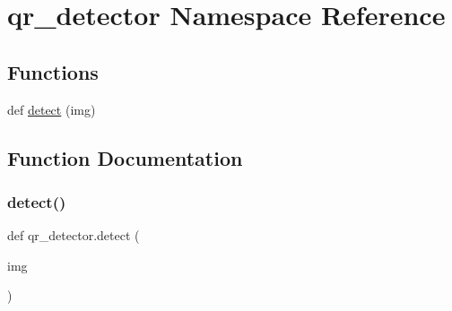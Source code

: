 \hypertarget{namespaceqr__detector}{}\section{qr\+\_\+detector Namespace Reference}
\label{namespaceqr__detector}
\subsection*{Functions}
\begin{DoxyCompactItemize}
\item 
def \hyperlink{namespaceqr__detector_a32598288ced3b4f05959d3e8695e947a}{detect} (img)
\end{DoxyCompactItemize}


\subsection{Function Documentation}
\mbox{\label{namespaceqr__detector_a32598288ced3b4f05959d3e8695e947a}} 
\subsubsection{\texorpdfstring{detect()}{detect()}}
{\footnotesize\ttfamily def qr\+\_\+detector.\+detect (\begin{DoxyParamCaption}\item[{}]{img }\end{DoxyParamCaption})}

